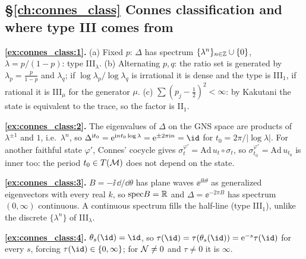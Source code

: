 {\subsection*{\S\ref{ch:connes_class} Connes classification and where type III comes from}
\textbf{\ref{ex:connes_class:1}.} (a) Fixed $p$: $\Delta$ has spectrum $\{\lambda^n\}_{n\in\mathbb{Z}}\cup\{0\}$, $\lambda=p/(1-p)$: type III$_\lambda$. (b) Alternating $p,q$: the ratio set is generated by $\lambda_p=\frac p{1-p}$ and $\lambda_q$; if $\log\lambda_p/\log\lambda_q$ is irrational it is dense and the type is III$_1$, if rational it is III$_\mu$ for the generator $\mu$. (c) $\sum(p_j-\frac12)^2<\infty$: by Kakutani the state is equivalent to the trace, so the factor is II$_1$.\par
\textbf{\ref{ex:connes_class:2}.} The eigenvalues of $\Delta$ on the GNS space are products of $\lambda^{\pm1}$ and $1$, i.e.\ $\lambda^n$, so $\Delta^{\ii t_0}=\ee^{\ii nt_0\log\lambda}=\ee^{\pm2\pi\ii n}=\id$ for $t_0=2\pi/|\log\lambda|$. For another faithful state $\varphi'$, Connes' cocycle gives $\sigma^{\varphi'}_t=\mathrm{Ad}\,u_t\circ\sigma_t$, so $\sigma^{\varphi'}_{t_0}=\mathrm{Ad}\,u_{t_0}$ is inner too: the period $t_0\in T(\mathcal{M})$ does not depend on the state.\par
\textbf{\ref{ex:connes_class:3}.} $B=-\ii\,\dd/\dd\theta$ has plane waves $\ee^{\ii k\theta}$ as generalized eigenvectors with every real $k$, so $\mathrm{spec}B=\mathbb{R}$ and $\Delta=\ee^{-2\pi B}$ has spectrum $(0,\infty)$ continuous. A continuous spectrum fills the half-line (type III$_1$), unlike the discrete $\{\lambda^n\}$ of III$_\lambda$.\par
\textbf{\ref{ex:connes_class:4}.} $\theta_s(\id)=\id$, so $\tau(\id)=\tau(\theta_s(\id))=\ee^{-s}\tau(\id)$ for every $s$, forcing $\tau(\id)\in\{0,\infty\}$; for $\mathcal{N}\ne0$ and $\tau\ne0$ it is $\infty$.\par

}
